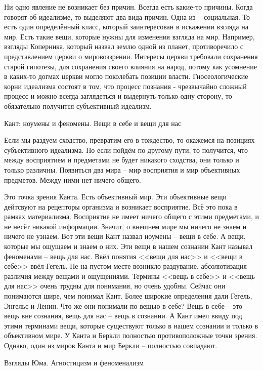     Ни одно явление не возникает без причин. Всегда есть какие-то причины. Когда говорят об идеализме, то выделяют два вида причин. Одна из – социальная. То есть один определённый класс, который заинтересован в искажении взгляда на мир. Есть такие вещи, которые нужны для изменения взгляда на мир. Например, взгляды Коперника, который назвал землю одной из планет, противоречило с представлением церкви о мировоззрении. Интересы церкви требовали сохранения старой гипотезы, для сохранения своего влияния на народ, потому как усомнение в каких-то догмах церкви могло поколебать позиции власти. Гносеологические корни идеализма состоят в том, что процесс познания - чрезвычайно сложный процесс и можно всегда заглядеться и выдернуть только одну сторону, то обязательно получится субъективный идеализм.

Кант: ноумены и феномены. Вещи в себе и вещи для нас

Если мы раздуем сходство, превратим его в тождество, то окажемся на позициях субъективного идеализма. Но если пойдём по другому пути, то получится, что между восприятием и предметами не будет никакого сходства, они только и только различны. Появиться два мира – мир восприятия и мир объективных предметов. Между ними нет ничего общего.

    Это точка зрения Канта. Есть объективный мир. Эти объективные вещи дейтсвуют на рецепторы организма и возникает восприятие. Всё это пока в рамках материализма. Восприятие не имеет ничего общего с этими предметами, и не несёт никакой информации. Значит, о внешнем мире мы ничего не знаем и ничего не узнаем. Вот эти вещи Кант назвал ноумены – вещи в себе. А вещи, которые мы ощущаем и знаем о них. Эти вещи в нашем сознании Кант называл феноменами – вещь для нас. Ввёл понятия <<вещи для нас>> и <<вещи в себе>> ввёл Гегель. Не на пустом месте возникло раздувание, абсолютизация различия между вещами и ощущениями. Термины <<вещь в себе>> и <<вещь для нас>> очень трудны для понимания, но очень удобны. Сейчас они понимаются шире, чем понимал Кант. Более широкие определения дали Гегель, Энгельс и Ленин. Что же они понимали по вещью в себе? Вещь в себе – это вещь вне сознания, вещь для нас – вещь в сознании. А Кант имел ввиду под этими терминами вещи, которые существуют только в нашем сознании и только в объективном мире. У Канта и Беркли полностью противоположные точки зрения. Однако, один из миров Канта и мир Беркли – полностью совпадают.

Взгляды Юма. Агностицизм и феноменализм

